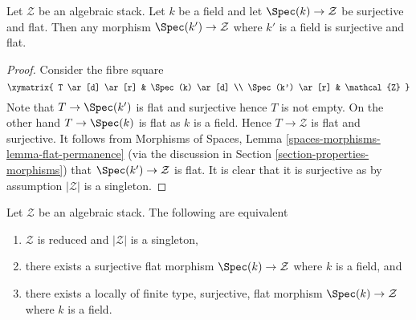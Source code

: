 \begin{lemma}
\label{lemma-flat-cover-by-field}
Let $\mathcal{Z}$ be an algebraic stack. Let $k$ be a field and let
$\Spec(k) \to \mathcal{Z}$ be surjective and flat. Then any
morphism $\Spec(k') \to \mathcal{Z}$ where $k'$ is a field is
surjective and flat.
\end{lemma}

\begin{proof}
Consider the fibre square
$$
\xymatrix{
T \ar[d] \ar[r] & \Spec(k) \ar[d] \\
\Spec(k') \ar[r] & \mathcal{Z}
}
$$
Note that $T \to \Spec(k')$ is flat and surjective hence $T$
is not empty. On the other hand $T \to \Spec(k)$ is flat as
$k$ is a field. Hence $T \to \mathcal{Z}$ is flat and surjective.
It follows from
Morphisms of Spaces, Lemma \ref{spaces-morphisms-lemma-flat-permanence}
(via the discussion in
Section \ref{section-properties-morphisms})
that $\Spec(k') \to \mathcal{Z}$ is flat. It is clear that it
is surjective as by assumption $|\mathcal{Z}|$ is a singleton.
\end{proof}

\begin{lemma}
\label{lemma-unique-point}
Let $\mathcal{Z}$ be an algebraic stack. The following are equivalent
\begin{enumerate}
\item $\mathcal{Z}$ is reduced and $|\mathcal{Z}|$ is a singleton,
\item there exists a surjective flat morphism $\Spec(k) \to \mathcal{Z}$
where $k$ is a field, and
\item there exists a locally of finite type, surjective, flat morphism
$\Spec(k) \to \mathcal{Z}$ where $k$ is a field.
\end{enumerate}
\end{lemma}

